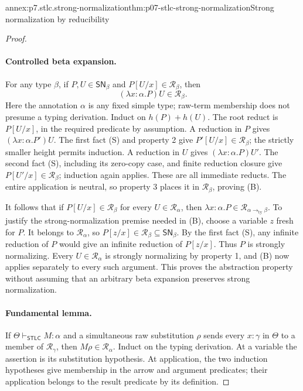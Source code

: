 \begin{annexitem}{annex:p7.stlc.strong-normalization}{thm:p07-stlc-strong-normalization}{Strong normalization by reducibility}
\begin{proof}
\paragraph{Controlled beta expansion.}
For any type \(\beta\), if \(P,U\in\mathsf{SN}_\beta\) and
\(P[U/x]\in\mathcal R_\beta\), then
\[
       (\lambda x{:}\alpha.P)U\in\mathcal R_\beta.       \tag{B}
\]
Here the annotation \(\alpha\) is any fixed simple type; raw-term membership
does not presume a typing derivation. Induct on \(h(P)+h(U)\).
The root reduct is \(P[U/x]\), in the required predicate by assumption.
A reduction in \(P\) gives \((\lambda x{:}\alpha.P')U\).
The first fact (S) and property 2 give
\(P'[U/x]\in\mathcal R_\beta\); the strictly smaller height permits
induction. A reduction in \(U\) gives \((\lambda x{:}\alpha.P)U'\).
The second fact (S), including its zero-copy case, and finite reduction
closure give \(P[U'/x]\in\mathcal R_\beta\); induction again applies.
These are all immediate reducts. The entire application is neutral, so
property 3 places it in \(\mathcal R_\beta\), proving (B).

It follows that if \(P[U/x]\in\mathcal R_\beta\) for every
\(U\in\mathcal R_\alpha\), then
\(\lambda x{:}\alpha.P\in
 \mathcal R_{\alpha\mathbin{\to_{\mathrm{ty}}}\beta}\).
To justify the strong-normalization premise needed in (B), choose a variable
\(z\) fresh for \(P\). It belongs to \(\mathcal R_\alpha\), so
\(P[z/x]\in\mathcal R_\beta\subseteq\mathsf{SN}_\beta\).
By the first fact (S), any infinite reduction of \(P\) would give an
infinite reduction of \(P[z/x]\). Thus \(P\) is strongly normalizing.
Every \(U\in\mathcal R_\alpha\) is strongly normalizing by property 1,
and (B) now applies separately to every such argument. This proves the
abstraction property without assuming that an arbitrary beta expansion
preserves strong normalization.

\paragraph{Fundamental lemma.}
If \(\Theta\vdash_{\mathsf{STLC}}M:\alpha\) and a simultaneous raw
substitution \(\rho\) sends every \(x:\gamma\) in \(\Theta\) to a
member of \(\mathcal R_\gamma\), then \(M\rho\in\mathcal R_\alpha\).
Induct on the typing derivation. At a variable the assertion is its
substitution hypothesis. At application, the two induction hypotheses
give membership in the arrow and argument predicates; their application
belongs to the result predicate by its definition.


\end{proof}
\end{annexitem}
